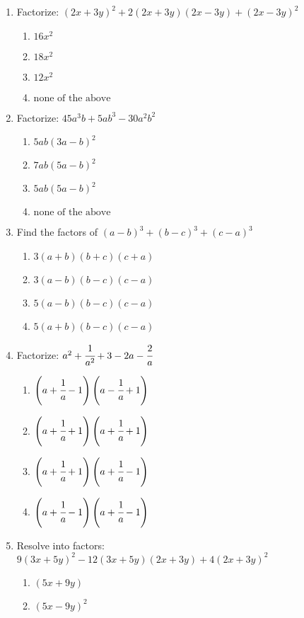 \begin{multicols}{2}
\begin{enumerate}[label={\arabic*.}]
\begin{enumerate}[label={\Alph*.}]
	\end{enumerate}
\item Factorize: $(2x + 3y)^2 + 2(2x + 3y)(2x - 3y) + (2x - 3y)^2$
	\begin{enumerate}[label={\Alph*.}]
	\item \(16x^2\)
	\item \(18x^2\)
	\item \(12x^2\)
	\item \(\text{none of the above }\)
	\end{enumerate}
\item Factorize: $45a^3b + 5ab^3 -30a^2b^2$
	\begin{enumerate}[label={\Alph*.}]
	\item \(5ab(3a -b)^2\)
	\item \(7ab(5a - b)^2\)
	\item \(5ab(5a - b)^2\)
	\item \(\text{none of the above}\)
	\end{enumerate}
\item Find the factors of $(a-b)^3 + (b-c)^3 + (c-a)^3$
	\begin{enumerate}[label={\Alph*.}]
	\item \(3(a+b)(b+c)(c+a)\)
	\item \(3(a-b)(b-c)(c-a)\)
	\item \(5(a-b)(b-c)(c-a)\)
	\item \(5(a+b)(b-c)(c-a)\)
	\end{enumerate}
\item Factorize: $a^2 + \cfrac{1}{a^2} + 3 - 2a - \cfrac{2}{a}$ \\
	\begin{enumerate}[label={\Alph*.}]
	\item \(\left(a+ \cfrac{1}{a} - 1\right)\left(a - \cfrac{1}{a} + 1\right)\)
	\item \(\left(a + \cfrac{1}{a} + 1\right) \left(a+ \cfrac{1}{a} + 1\right) \)
	\item \(\left(a + \cfrac{1}{a} + 1\right) \left(a+ \cfrac{1}{a} - 1\right)\)
	\item \(\left(a + \cfrac{1}{a} - 1\right) \left(a+ \cfrac{1}{a} - 1\right)\)
	\end{enumerate}
\item Resolve into factors: $9(3x + 5y)^2 - 12(3x + 5y)(2x + 3y) + 4(2x + 3y)^2$
	\begin{enumerate}[label={\Alph*.}]
	\item \((5x + 9y)\)
	\item \((5x - 9y)^2\)

\end{enumerate}
\end{enumerate}
\end{multicols}
